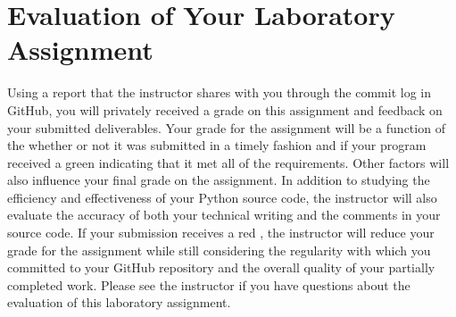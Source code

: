\documentclass[11pt]{article}
\newcommand{\checkmark}{\ding{51}}
\newcommand{\naughtmark}{\ding{55}}
\begin{document}
\section*{Evaluation of Your Laboratory Assignment}

Using a report that the instructor shares with you through the commit log in GitHub, you will privately received a grade
on this assignment and feedback on your submitted deliverables. Your grade for the assignment will be a function of the
whether or not it was submitted in a timely fashion and if your program received a green \checkmark{} indicating that it
met all of the requirements. Other factors will also influence your final grade on the assignment. In addition to
studying the efficiency and effectiveness of your Python source code, the instructor will also evaluate the accuracy of
both your technical writing and the comments in your source code. If your submission receives a red \naughtmark{}, the
instructor will reduce your grade for the assignment while still considering the regularity with which you committed to
your GitHub repository and the overall quality of your partially completed work. Please see the instructor if you have
questions about the evaluation of this laboratory assignment.


\end{document}
